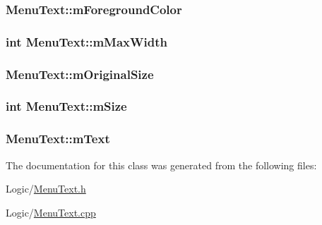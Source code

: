 \subsubsection[{\texorpdfstring{m\+Foreground\+Color}{mForegroundColor}}]{ Menu\+Text\+::m\+Foreground\+Color\hspace{0.3cm}{\ttfamily [private]}}\hypertarget{classMenuText_ae8ff29e9a39b2a4da11842f4a95179ca}{}\label{classMenuText_ae8ff29e9a39b2a4da11842f4a95179ca}
\subsubsection[{\texorpdfstring{m\+Max\+Width}{mMaxWidth}}]{\setlength{\rightskip}{0pt plus 5cm}int Menu\+Text\+::m\+Max\+Width\hspace{0.3cm}{\ttfamily [private]}}\hypertarget{classMenuText_a011e48b009e1a8c5ae43d287ddfb6c5e}{}\label{classMenuText_a011e48b009e1a8c5ae43d287ddfb6c5e}
\subsubsection[{\texorpdfstring{m\+Original\+Size}{mOriginalSize}}]{ Menu\+Text\+::m\+Original\+Size\hspace{0.3cm}{\ttfamily [private]}}\hypertarget{classMenuText_ab91095e7135b4e9e85998a135ab9790a}{}\label{classMenuText_ab91095e7135b4e9e85998a135ab9790a}
\subsubsection[{\texorpdfstring{m\+Size}{mSize}}]{\setlength{\rightskip}{0pt plus 5cm}int Menu\+Text\+::m\+Size\hspace{0.3cm}{\ttfamily [private]}}\hypertarget{classMenuText_ad0dbcb6a2dcae145e0ada8ec5be5794a}{}\label{classMenuText_ad0dbcb6a2dcae145e0ada8ec5be5794a}
\subsubsection[{\texorpdfstring{m\+Text}{mText}}]{ Menu\+Text\+::m\+Text\hspace{0.3cm}{\ttfamily [private]}}\hypertarget{classMenuText_ad6915b206bf3f3763f65856176073a1d}{}\label{classMenuText_ad6915b206bf3f3763f65856176073a1d}


The documentation for this class was generated from the following files\+:\begin{DoxyCompactItemize}
\item 
Logic/\hyperlink{MenuText_8h}{Menu\+Text.\+h}\item 
Logic/\hyperlink{MenuText_8cpp}{Menu\+Text.\+cpp}\end{DoxyCompactItemize}
